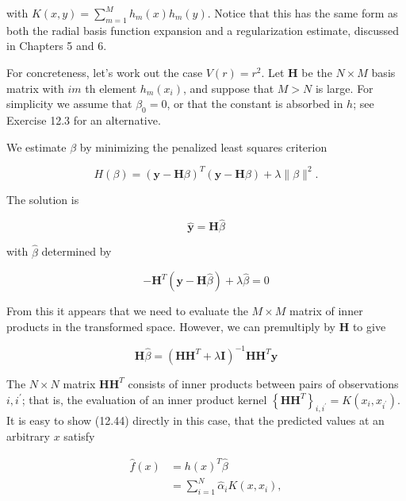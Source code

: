 \documentclass[10pt]{article}
\begin{document}
with $K(x, y)=\sum_{m=1}^{M} h_{m}(x) h_{m}(y)$. Notice that this has the same form as both the radial basis function expansion and a regularization estimate, discussed in Chapters 5 and 6.

For concreteness, let's work out the case $V(r)=r^{2}$. Let $\mathbf{H}$ be the $N \times M$ basis matrix with $i m$ th element $h_{m}\left(x_{i}\right)$, and suppose that $M>N$ is large. For simplicity we assume that $\beta_{0}=0$, or that the constant is absorbed in $h$; see Exercise 12.3 for an alternative.

We estimate $\beta$ by minimizing the penalized least squares criterion


\begin{equation*}
H(\beta)=(\mathbf{y}-\mathbf{H} \beta)^{T}(\mathbf{y}-\mathbf{H} \beta)+\lambda\|\beta\|^{2} . \tag{12.45}
\end{equation*}


The solution is


\begin{equation*}
\hat{\mathbf{y}}=\mathbf{H} \hat{\beta} \tag{12.46}
\end{equation*}


with $\hat{\beta}$ determined by


\begin{equation*}
-\mathbf{H}^{T}(\mathbf{y}-\mathbf{H} \hat{\beta})+\lambda \hat{\beta}=0 \tag{12.47}
\end{equation*}


From this it appears that we need to evaluate the $M \times M$ matrix of inner products in the transformed space. However, we can premultiply by $\mathbf{H}$ to give


\begin{equation*}
\mathbf{H} \hat{\beta}=\left(\mathbf{H} \mathbf{H}^{T}+\lambda \mathbf{I}\right)^{-1} \mathbf{H} \mathbf{H}^{T} \mathbf{y} \tag{12.48}
\end{equation*}


The $N \times N$ matrix $\mathbf{H H}^{T}$ consists of inner products between pairs of observations $i, i^{\prime}$; that is, the evaluation of an inner product kernel $\left\{\mathbf{H H}^{T}\right\}_{i, i^{\prime}}= K\left(x_{i}, x_{i^{\prime}}\right)$. It is easy to show (12.44) directly in this case, that the predicted values at an arbitrary $x$ satisfy


\begin{align*}
\hat{f}(x) & =h(x)^{T} \hat{\beta} \\
& =\sum_{i=1}^{N} \hat{\alpha}_{i} K\left(x, x_{i}\right), \tag{12.49}
\end{align*}
\end{document}
